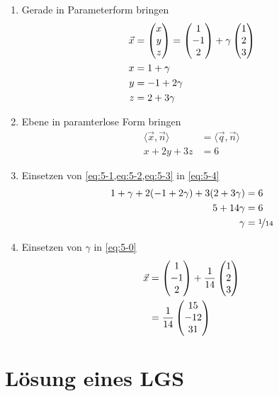 \documentclass[english,ngerman,fontsize=9pt,intoc,index=totoc,refpage,listof=totoc,draft]{scrbook}
\numberwithin{equation}{section}
\begin{document}
\begin{enumerate}
  \item Gerade in Parameterform bringen
	\begin{align}
		\vec{x} & = \veccc(x;y;z) = \veccc(1;-1;2) + \gamma\veccc(1;2;3) \label{eq:5-0} \\
		x       & = 1 + \gamma \label{eq:5-1}                                           \\
		y       & = -1 + 2\gamma \label{eq:5-2}                                         \\
		z       & = 2 + 3\gamma \label{eq:5-3}
	\end{align}
  \item Ebene in paramterlose Form bringen
	\begin{align}
	  \langle \vec{x},\vec{n} \rangle  & =\langle \vec{q},\vec{n} \rangle \nonumber \\
	  x + 2y + 3z                      & = 6 \label{eq:5-4}
	\end{align}
  \item Einsetzen von \cref{eq:5-1,eq:5-2,eq:5-3} in \cref{eq:5-4}
	\begin{align*}
		1 + \gamma + 2(-1+2\gamma) + 3(2+3\gamma) & =6                 \\
		5 + 14\gamma                              & =6                 \\
		\gamma                                    & = \nicefrac{1}{14}
	\end{align*}
  \item Einsetzen von $\gamma$ in \cref{eq:5-0}
	\begin{align*}
		\vec{x} & = \veccc(1;-1;2) + \frac{1}{14} \veccc(1;2;3) \\
		        & = \frac{1}{14} \veccc(15;-12;31)
	\end{align*}
\end{enumerate}


\section{\label{sec:bsp-LGS-unendlich}Lösung eines LGS}

\end{document}
